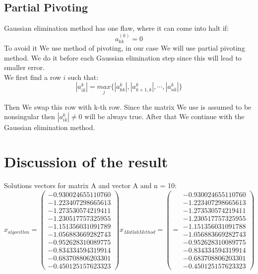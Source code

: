 \documentclass[12pt]{report}
\begin{document}
\subsection{Partial Pivoting}
Gaussian elimination method has one flaw, where it can come into halt if:
\[ a_{kk}^{(k)} = 0 \]
To avoid it We use method of pivoting, in our case We will use partial pivoting method.
We do it before each Gaussian elimination step since this will lead to smaller error.
\\We first find a row $i$ such that:
\[ |{a_{ik}^{k}}| = \underset{j}{max} \{ |{a_{kk}^{k}}|, |{a_{k+1, k}^{k}}|, \cdots, |{a_{nk}^{k}}|\} \]

Then We swap this row with k-th row. Since the matrix We use is assumed to be nonsingular then $|{a_{ik}^{k}}| \neq 0$ will be always true. After that We continue with the Gaussian elimination method.

\section{Discussion of the result}
Solutions vectors for matrix A and vector A and n = 10:
\[ x_{algorithm} = \left(\begin{array}{cc}
-0.930024655110760 \\
-1.223407298665613 \\
-1.273530574219411 \\
-1.230517757325955 \\
-1.151356031091789 \\
-1.056883669282743 \\
-0.952628310089775 \\
-0.834334594319914 \\
-0.683708806203301 \\
-0.450125157623323
\end{array} \right)
%
x_{Matlab Method} = \left(  = \begin{array}{cc}
-0.930024655110760 \\
-1.223407298665613 \\
-1.273530574219411 \\
-1.230517757325955 \\
-1.151356031091788 \\
-1.056883669282743 \\
-0.952628310089775 \\
-0.834334594319914 \\
-0.683708806203301 \\
-0.450125157623323
\end{array} \right)
\]
\end{document}
